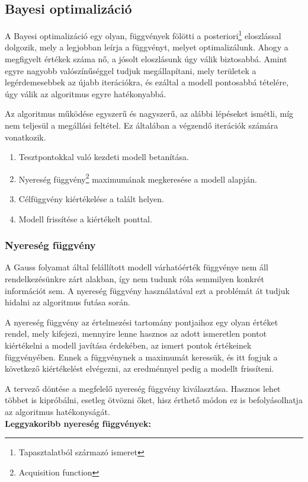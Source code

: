 \subsection{Bayesi optimalizáció}

\label{subsec:bayes}
A Bayesi optimalizáció egy olyan, függvények fölötti a posteriori\footnote{Tapasztalatból származó ismeret} eloszlással dolgozik, mely a legjobban leírja a függvényt, melyet optimalizálunk. Ahogy a megfigyelt értékek száma nő, a jósolt eloszlásunk úgy válik biztosabbá. Amint egyre nagyobb valószínűséggel tudjuk megállapítani, mely területek a legérdemesebbek az újabb iterációkra, és ezáltal a modell pontosabbá tételére, úgy válik az algoritmus egyre hatékonyabbá.

Az algoritmus működése egyszerű és nagyszerű, az alábbi lépéseket ismétli, míg nem teljesül a megállási feltétel. Ez általában a végzendő iterációk számára vonatkozik.
\begin{enumerate}
	\item Tesztpontokkal való kezdeti modell betanítása.
	\item Nyereség függvény\footnote{Acquisition function} maximumának megkeresése a modell alapján.
	\item Célfüggvény kiértékelése a talált helyen.
	\item Modell frissítése a kiértékelt ponttal.
\end{enumerate}

\subsubsection{Nyereség függvény}

A Gauss folyamat által felállított modell várhatóérték függvénye nem áll rendelkezésünkre zárt alakban, így nem tudunk róla semmilyen konkrét információt sem. A nyereség függvény használatával ezt a problémát át tudjuk hidalni az algoritmus futása során. 

A nyereség függvény az értelmezési tartomány pontjaihoz egy olyan értéket rendel, mely kifejezi, mennyire lenne hasznos az adott ismeretlen pontot kiértékelni a modell javítása érdekében, az ismert pontok értékeinek függvényében. Ennek a függvénynek a maximumát keressük, és itt fogjuk a következő kiértékelést elvégezni, az eredménnyel pedig a modellt frissíteni.

A tervező döntése a megfelelő nyereség függvény kiválasztása. Hasznos lehet többet is kipróbálni, esetleg ötvözni őket, hisz érthető módon ez is befolyásolhatja az algoritmus hatékonyságát.\\[3mm]
\textbf{Leggyakoribb nyereség függvények\cite{AcqFgvCikk}:}
